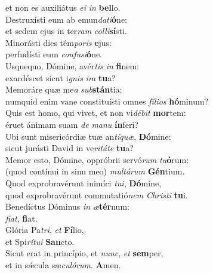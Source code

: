 \evenverse et non es auxiliátus \textit{e}\textit{i} \textit{in} \textbf{bel}lo.\\
\oddverse Destruxísti eum ab emun\textit{da}\textit{ti}\textbf{ó}ne:~\*\\
\oddverse et sedem ejus in ter\textit{ram} \textit{col}\textit{li}\textbf{sí}sti.\\
\evenverse Minorásti dies tém\textit{po}\textit{ris} \textbf{e}jus:~\*\\
\evenverse perfudísti eum \textit{con}\textit{fu}\textit{si}\textbf{ó}ne.\\
\oddverse Usquequo, Dómine, avér\textit{tis} \textit{in} \textbf{fi}nem:~\*\\
\oddverse exardéscet sicut i\textit{gnis} \textit{i}\textit{ra} \textbf{tu}a?\\
\evenverse Memoráre quæ me\textit{a} \textit{sub}\textbf{stán}tia:~\*\\
\evenverse numquid enim vane constituísti omnes \textit{fí}\textit{li}\textit{os} \textbf{hó}minum?\\
\oddverse Quis est homo, qui vivet, et non vi\textit{dé}\textit{bit} \textbf{mor}tem:~\*\\
\oddverse éruet ánimam suam \textit{de} \textit{ma}\textit{nu} \textbf{ín}feri?\\
\evenverse Ubi sunt misericórdiæ tuæ an\textit{tí}\textit{quæ}, \textbf{Dó}mine:~\*\\
\evenverse sicut jurásti David in ve\textit{ri}\textit{tá}\textit{te} \textbf{tu}a?\\
\oddverse Memor esto, Dómine, oppróbrii servó\textit{rum} \textit{tu}\textbf{ó}rum:~\*\\
\oddverse (quod contínui in sinu meo) \textit{mul}\textit{tá}\textit{rum} \textbf{Gén}tium.\\
\evenverse Quod exprobravérunt inimíci \textit{tu}\textit{i}, \textbf{Dó}mine,~\*\\
\evenverse quod exprobravérunt commutatió\textit{nem} \textit{Chri}\textit{sti} \textbf{tu}i.\\
\oddverse Benedíctus Dóminus \textit{in} \textit{æ}\textbf{tér}num:~\*\\
\oddverse \textit{fi}\textit{at}, \textbf{fi}at.\\
\evenverse Glória Pa\textit{tri}, \textit{et} \textbf{Fí}lio,~\*\\
\evenverse et Spi\textit{rí}\textit{tu}\textit{i} \textbf{San}cto.\\
\oddverse Sicut erat in princípio, et \textit{nunc}, \textit{et} \textbf{sem}per,~\*\\
\oddverse et in sǽcula sæ\textit{cu}\textit{ló}\textit{rum}. \textbf{A}men.\\
